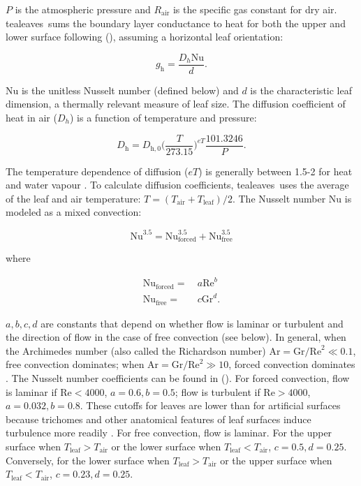 \documentclass[11pt, oneside]{article}
\newcommand{\pkg}[1]{{\fontseries{b}\selectfont #1}}
\newcommand{\tealeaves}{\pkg{tealeaves}}
\begin{document}
$P$ is the atmospheric pressure and $R_\mathrm{air}$ is the specific gas constant for dry air. \tealeaves~sums the boundary layer conductance to heat for both the upper and lower surface following \citeauthor{Foster_Smith_1986} (\citeyear{Foster_Smith_1986}), assuming a horizontal leaf orientation:

\begin{equation} \label{eq:g_h}
  g_\mathrm{h} = \frac{D_h \mathrm{Nu}}{d}.
\end{equation}

$\mathrm{Nu}$ is the unitless Nusselt number (defined below) and $d$ is the characteristic leaf dimension, a thermally relevant measure of leaf size. The diffusion coefficient of heat in air ($D_h$) is a function of temperature and pressure:

\begin{equation} \label{eq:D_x}
    D_\mathrm{h} = D_\mathrm{h,0} \Big(\frac{T}{273.15}\Big) ^ {\mathit{eT}} \frac{101.3246}{P}.
\end{equation}

The temperature dependence of diffusion ($\mathit{eT}$) is generally between 1.5-2 for heat and water vapour \citep{Monteith_Unsworth_2013}. To calculate diffusion coefficients, \tealeaves~uses the average of the leaf and air temperature: $T = (T_\mathrm{air} + T_\mathrm{leaf}) / 2$. The Nusselt number $\mathrm{Nu}$ is modeled as a mixed convection:

\begin{equation}
  \label{eq:nusselt}
  \mathrm{Nu} ^ {3.5} = \mathrm{Nu}_\mathrm{forced} ^ {3.5} + \mathrm{Nu}_\mathrm{free} ^ {3.5}
\end{equation}

where

\begin{align}
  \mathrm{Nu}_\mathrm{forced} =  & ~ a \mathrm{Re} ^ b \\
  \mathrm{Nu}_\mathrm{free} =    & ~ c \mathrm{Gr} ^ d.
\end{align}

$a, b, c, d$ are constants that depend on whether flow is laminar or turbulent and the direction of flow in the case of free convection (see below). In general, when the Archimedes number (also called the Richardson number) $\mathrm{Ar} = \mathrm{Gr} / \mathrm{Re} ^ 2 \ll 0.1$, free convection dominates; when $\mathrm{Ar} = \mathrm{Gr} / \mathrm{Re} ^ 2 \gg 10$, forced convection dominates \citep{Nobel_2009}. The Nusselt number coefficients can be found in \citeauthor{Monteith_Unsworth_2013} (\citeyear{Monteith_Unsworth_2013}). For forced convection, flow is laminar if $\mathrm{Re} < 4000$, $a = 0.6, b = 0.5$; flow is turbulent if $\mathrm{Re} > 4000$, $a = 0.032, b = 0.8$. These cutoffs for leaves are lower than for artificial surfaces because trichomes and other anatomical features of leaf surfaces induce turbulence more readily \citep{Grace_Wilson_1976}. For free convection, flow is laminar. For the upper surface when $T_\mathrm{leaf} > T_\mathrm{air}$ or the lower surface when $T_\mathrm{leaf} < T_\mathrm{air}$, $c = 0.5, d = 0.25$. Conversely, for the lower surface when $T_\mathrm{leaf} > T_\mathrm{air}$ or the upper surface when $T_\mathrm{leaf} < T_\mathrm{air}$, $c = 0.23, d = 0.25$.
\end{document}

